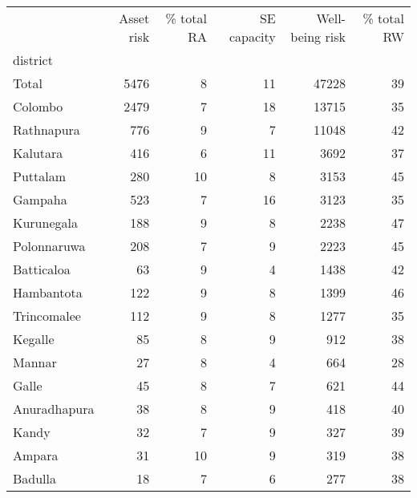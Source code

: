 \begin{tabular}{lrrrrr}
\toprule
{} &  Asset risk &  \% total RA &  SE capacity &  Well-being risk &  \% total RW \\
district     &             &             &              &                  &             \\
\midrule
Total        &        5476 &           8 &           11 &            47228 &          39 \\
Colombo      &        2479 &           7 &           18 &            13715 &          35 \\
Rathnapura   &         776 &           9 &            7 &            11048 &          42 \\
Kalutara     &         416 &           6 &           11 &             3692 &          37 \\
Puttalam     &         280 &          10 &            8 &             3153 &          45 \\
Gampaha      &         523 &           7 &           16 &             3123 &          35 \\
Kurunegala   &         188 &           9 &            8 &             2238 &          47 \\
Polonnaruwa  &         208 &           7 &            9 &             2223 &          45 \\
Batticaloa   &          63 &           9 &            4 &             1438 &          42 \\
Hambantota   &         122 &           9 &            8 &             1399 &          46 \\
Trincomalee  &         112 &           9 &            8 &             1277 &          35 \\
Kegalle      &          85 &           8 &            9 &              912 &          38 \\
Mannar       &          27 &           8 &            4 &              664 &          28 \\
Galle        &          45 &           8 &            7 &              621 &          44 \\
Anuradhapura &          38 &           8 &            9 &              418 &          40 \\
Kandy        &          32 &           7 &            9 &              327 &          39 \\
Ampara       &          31 &          10 &            9 &              319 &          38 \\
Badulla      &          18 &           7 &            6 &              277 &          38 \\

\end{tabular}

